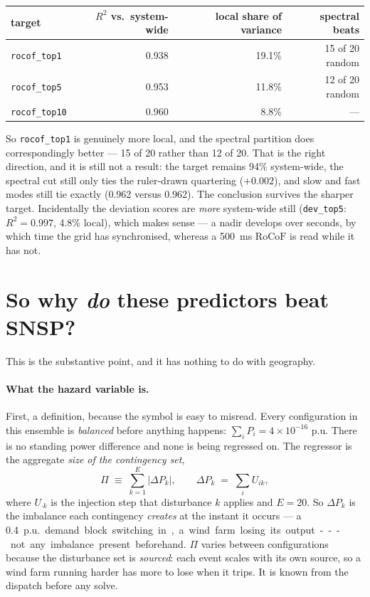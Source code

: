 \documentclass[11pt,a4paper]{article}
\newcommand{\rocof}{\ensuremath{\mathrm{RoCoF}}}
\newcommand{\Rtwo}{\ensuremath{R^{2}}}
\begin{document}
\begin{table}[h]
\centering
\small
\begin{tabular}{lrrr}
\toprule
target & \Rtwo{} vs.\ system-wide & local share of variance & spectral beats \\
\midrule
\texttt{rocof\_top1}  & 0.938 & 19.1\% & 15 of 20 random \\
\texttt{rocof\_top5}  & 0.953 & 11.8\% & 12 of 20 random \\
\texttt{rocof\_top10} & 0.960 & \ \ 8.8\% & --- \\
\bottomrule
\end{tabular}
\end{table}

So \texttt{rocof\_top1} is genuinely more local, and the spectral partition
does correspondingly better --- 15 of 20 rather than 12 of 20. That is the
right direction, and it is still not a result: the target remains 94\%
system-wide, the spectral cut still only ties the ruler-drawn quartering
($+0.002$), and slow and fast modes still tie exactly (0.962 versus 0.962).
The conclusion survives the sharper target. Incidentally the deviation
scores are \emph{more} system-wide still (\texttt{dev\_top5}: $\Rtwo=0.997$,
4.8\% local), which makes sense --- a nadir develops over seconds, by which
time the grid has synchronised, whereas a \SI{500}{\milli\second} \rocof{}
is read while it has not.

\section{So why \emph{do} these predictors beat SNSP?}

This is the substantive point, and it has nothing to do with geography.

\paragraph{What the hazard variable is.} First, a definition, because the
symbol is easy to misread. Every configuration in this ensemble is
\emph{balanced} before anything happens: $\sum_i P_i = 4\times10^{-16}$ p.u.
There is no standing power difference and none is being regressed on. The
regressor is the aggregate \emph{size of the contingency set},
\begin{equation}
\Pi \;\equiv\; \sum_{k=1}^{E}\bigl|\Delta P_k\bigr|,
\qquad
\Delta P_k \;=\; \textstyle\sum_i U_{ik},
\label{eq:hazard}
\end{equation}
where $U_{\cdot k}$ is the injection step that disturbance $k$ applies and
$E=20$. So $\Delta P_k$ is the imbalance each contingency \emph{creates} at
the instant it occurs --- a \SI{0.4}{p.u.} demand block switching in, a wind
farm losing its output --- not any imbalance present beforehand. $\Pi$ varies
between configurations because the disturbance set is \emph{sourced}: each
event scales with its own source, so a wind farm running harder has more to
lose when it trips. It is known from the dispatch before any solve.
\end{document}
